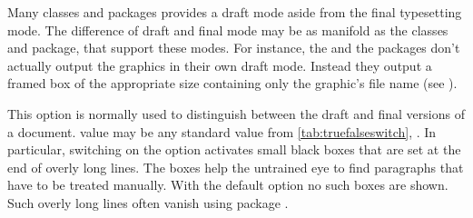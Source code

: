 Many classes and packages provides a draft mode aside from the final
typesetting mode. The difference of draft and final mode may be as manifold as
the classes and package, that support these modes.  For instance, the
 and the
 packages don't actually output the
graphics in their own draft mode. Instead they output a framed box of the
appropriate size containing only the graphic's file name (see
\cite{package:graphics}).%

\begin{Declaration}
\end{Declaration}%
%
This option is normally used to distinguish
between the draft and final versions of a document. 
value may be any standard value from \autoref{tab:truefalseswitch},
. In particular, switching on the option
 activates small black boxes that are set
at the end of overly long lines. The boxes help the untrained eye to find
paragraphs that have to be treated manually. With the default
 option no such boxes are shown. Such overly long
lines often vanish using package
\cite{package:microtype}.
%
%

\fi %


